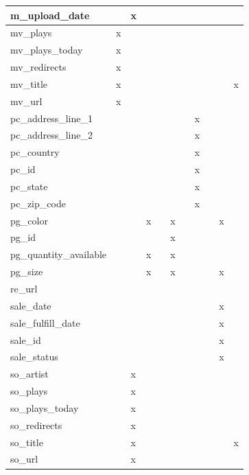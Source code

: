 \documentclass[11pt, a4paper]{report}
\begin{document}
\begin{longtable}{|l|l|l|l|l|l|l|l|l|l|l|}
m\_upload\_date         &   & x &   &   &   &   &   &   &   &   \\ \hline
mv\_plays               & x &   &   &   &   &   &   &   &   &   \\ \hline
mv\_plays\_today        & x &   &   &   &   &   &   &   &   &   \\ \hline
mv\_redirects           & x &   &   &   &   &   &   &   &   &   \\ \hline
mv\_title               & x &   &   &   &   &   &   &   &   & x \\ \hline
mv\_url                 & x &   &   &   &   &   &   &   &   &   \\ \hline
pc\_address\_line\_1    &   &   &   &   &   &   & x &   &   &   \\ \hline
pc\_address\_line\_2    &   &   &   &   &   &   & x &   &   &   \\ \hline
pc\_country             &   &   &   &   &   &   & x &   &   &   \\ \hline
pc\_id                  &   &   &   &   &   &   & x &   &   &   \\ \hline
pc\_state               &   &   &   &   &   &   & x &   &   &   \\ \hline
pc\_zip\_code           &   &   &   &   &   &   & x &   &   &   \\ \hline
pg\_color               &   &   & x &   & x &   &   &   & x &   \\ \hline
pg\_id                  &   &   &   &   & x &   &   &   &   &   \\ \hline
pg\_quantity\_available &   &   & x &   & x &   &   &   &   &   \\ \hline
pg\_size                &   &   & x &   & x &   &   &   & x &   \\ \hline
re\_url                 &   &   &   &   &   &   &   &   &   &   \\ \hline
sale\_date              &   &   &   &   &   &   &   &   & x &   \\ \hline
sale\_fulfill\_date     &   &   &   &   &   &   &   &   & x &   \\ \hline
sale\_id                &   &   &   &   &   &   &   &   & x &   \\ \hline
sale\_status            &   &   &   &   &   &   &   &   & x &   \\ \hline
so\_artist              &   & x &   &   &   &   &   &   &   &   \\ \hline
so\_plays               &   & x &   &   &   &   &   &   &   &   \\ \hline
so\_plays\_today        &   & x &   &   &   &   &   &   &   &   \\ \hline
so\_redirects           &   & x &   &   &   &   &   &   &   &   \\ \hline
so\_title               &   & x &   &   &   &   &   &   &   & x \\ \hline
so\_url                 &   & x &   &   &   &   &   &   &   &   \\ \hline

\end{longtable}
\end{document}
